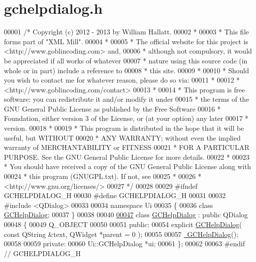 \hypertarget{gchelpdialog_8h_source}{\section{gchelpdialog.\-h}
}

\begin{DoxyCode}
00001 \textcolor{comment}{/* Copyright (c) 2012 - 2013 by William Hallatt.}
00002 \textcolor{comment}{ *}
00003 \textcolor{comment}{ * This file forms part of "XML Mill".}
00004 \textcolor{comment}{ *}
00005 \textcolor{comment}{ * The official website for this project is <http://www.goblincoding.com> and,}
00006 \textcolor{comment}{ * although not compulsory, it would be appreciated if all works of whatever}
00007 \textcolor{comment}{ * nature using this source code (in whole or in part) include a reference to}
00008 \textcolor{comment}{ * this site.}
00009 \textcolor{comment}{ *}
00010 \textcolor{comment}{ * Should you wish to contact me for whatever reason, please do so via:}
00011 \textcolor{comment}{ *}
00012 \textcolor{comment}{ *                 <http://www.goblincoding.com/contact>}
00013 \textcolor{comment}{ *}
00014 \textcolor{comment}{ * This program is free software: you can redistribute it and/or modify it
       under}
00015 \textcolor{comment}{ * the terms of the GNU General Public License as published by the Free
       Software}
00016 \textcolor{comment}{ * Foundation, either version 3 of the License, or (at your option) any later}
00017 \textcolor{comment}{ * version.}
00018 \textcolor{comment}{ *}
00019 \textcolor{comment}{ * This program is distributed in the hope that it will be useful, but WITHOUT}
00020 \textcolor{comment}{ * ANY WARRANTY; without even the implied warranty of MERCHANTABILITY or
       FITNESS}
00021 \textcolor{comment}{ * FOR A PARTICULAR PURPOSE.  See the GNU General Public License for more
       details.}
00022 \textcolor{comment}{ *}
00023 \textcolor{comment}{ * You should have received a copy of the GNU General Public License along with}
00024 \textcolor{comment}{ * this program (GNUGPL.txt).  If not, see}
00025 \textcolor{comment}{ *}
00026 \textcolor{comment}{ *                    <http://www.gnu.org/licenses/>}
00027 \textcolor{comment}{ */}
00028 
00029 \textcolor{preprocessor}{#ifndef GCHELPDIALOG\_H}
00030 \textcolor{preprocessor}{}\textcolor{preprocessor}{#define GCHELPDIALOG\_H}
00031 \textcolor{preprocessor}{}
00032 \textcolor{preprocessor}{#include <QDialog>}
00033 
00034 \textcolor{keyword}{namespace }Ui
00035 \{
00036   \textcolor{keyword}{class }\hyperlink{class_g_c_help_dialog}{GCHelpDialog};
00037 \}
00038 
00040 
\hypertarget{gchelpdialog_8h_source_l00047}{}\hyperlink{class_g_c_help_dialog}{00047} \textcolor{keyword}{class }\hyperlink{class_g_c_help_dialog}{GCHelpDialog} : \textcolor{keyword}{public} QDialog
00048 \{
00049   Q\_OBJECT
00050   
00051 \textcolor{keyword}{public}:
00054   \textcolor{keyword}{explicit} \hyperlink{class_g_c_help_dialog_ab50a71cb98a1d9375288703bcd1e3be1}{GCHelpDialog}( \textcolor{keyword}{const} QString &text, QWidget *parent = 0 );
00055 
00057   \hyperlink{class_g_c_help_dialog_ae8e5aa465ea3bd2fa4d922b0cc09cfdc}{~GCHelpDialog}();
00058   
00059 \textcolor{keyword}{private}:
00060   Ui::GCHelpDialog *ui;
00061 \};
00062 
00063 \textcolor{preprocessor}{#endif // GCHELPDIALOG\_H}
\end{DoxyCode}
